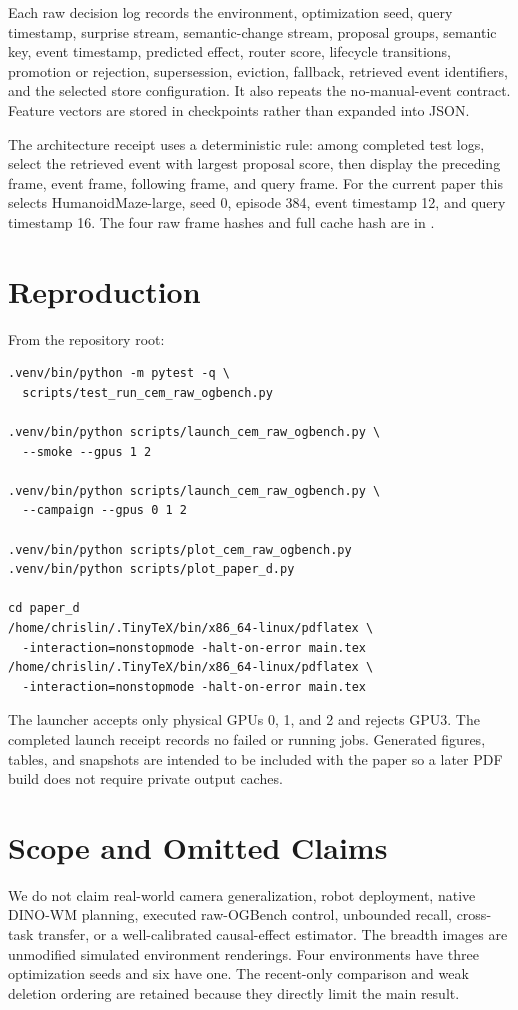 Each raw decision log records the environment, optimization seed, query
timestamp, surprise stream, semantic-change stream, proposal groups, semantic
key, event timestamp, predicted effect, router score, lifecycle transitions,
promotion or rejection, supersession, eviction, fallback, retrieved event
identifiers, and the selected store configuration. It also repeats the
no-manual-event contract. Feature vectors are stored in checkpoints rather
than expanded into JSON.

The architecture receipt uses a deterministic rule: among completed test logs,
select the retrieved event with largest proposal score, then display the
preceding frame, event frame, following frame, and query frame. For the current
paper this selects HumanoidMaze-large, seed 0, episode 384, event timestamp 12,
and query timestamp 16. The four raw frame hashes and full cache hash are in
.

\section{Reproduction}
\label{app:reproduce}

From the repository root:
\begin{verbatim}
.venv/bin/python -m pytest -q \
  scripts/test_run_cem_raw_ogbench.py

.venv/bin/python scripts/launch_cem_raw_ogbench.py \
  --smoke --gpus 1 2

.venv/bin/python scripts/launch_cem_raw_ogbench.py \
  --campaign --gpus 0 1 2

.venv/bin/python scripts/plot_cem_raw_ogbench.py
.venv/bin/python scripts/plot_paper_d.py

cd paper_d
/home/chrislin/.TinyTeX/bin/x86_64-linux/pdflatex \
  -interaction=nonstopmode -halt-on-error main.tex
/home/chrislin/.TinyTeX/bin/x86_64-linux/pdflatex \
  -interaction=nonstopmode -halt-on-error main.tex
\end{verbatim}

The launcher accepts only physical GPUs 0, 1, and 2 and rejects GPU3. The
completed launch receipt records no failed or running jobs. Generated figures,
tables, and snapshots are intended to be included with the paper so a later
PDF build does not require private output caches.

\section{Scope and Omitted Claims}
\label{app:scope}

We do not claim real-world camera generalization, robot deployment, native
DINO-WM planning, executed raw-OGBench control, unbounded recall, cross-task
transfer, or a well-calibrated causal-effect estimator. The breadth images are
unmodified simulated environment renderings. Four environments have three
optimization seeds and six have one. The recent-only comparison and weak
deletion ordering are retained because they directly limit the main result.
